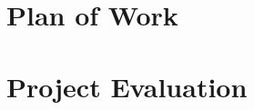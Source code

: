 \documentclass[12pt,a4paper]{report}
\theoremstyle{definition}
\begin{document}
\chapter{Plan of Work}


\chapter{Project Evaluation}





\newpage


\end{document}
